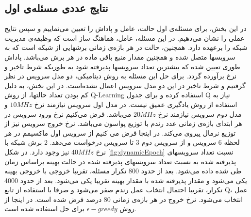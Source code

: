 \subsection{نتایج عددی مسئله‌ی اول}
در این بخش، برای مسئله‌ی اول حالت، عامل و پاداش را تعیین می‌نماییم و سپس نتایج عملی را نشان می‌دهیم.
در این مسئله، عامل، هماهنگ‌‌ ‌ساز  است که وظیفه‌ی مدیریت شبکه را برعهده دارد.
همچنین، حالت در هر بازه‌ی زمانی برشهایی از شبکه است که به سرویسها متصل شده و همچنین مقدار منبع باقی ماده در هر برش می‌باشد. 
پاداش طوری تعیین شده که بیشترین تعداد سرویسها پذیرفته شود به طوریکه شرط تاخیر و نرخ برآورده گردد.
برای حل این مسئله به روش دینامیکی، دو مدل سرویس در نظر گرفتیم و شرط تاخیر در این دو مدل سرویس اعمال نشده‌است.
در این بخش، به دلیل کم بودن تعداد حالتها، از روش Q-Learning استفاده کرده و برای جدول Q نیاز به استفاده از روش یادگیری عمیق نیست.
در مدل اول سرویس نیازمند نرخ $10MHz$ و مدل دوم سرویس نیازمند نرخ $20MHz$
می‌باشد. فرض می‌کنیم نرخ ورود سرویس در هر ابتدای بازه‌ی زمانی عدد رندم با توزیع پواسون می‌باشد. نرخ خروج سرویس نیز از توزیع نرمال پیروی می‌کند. در اینجا فرض می کنیم از  سرویس اول ماکسیمم در هر لحظه 6 سرویس و از سرویس دوم 3 تا سرویس درخواست می‌دهد. 2 برش شبکه با نرخ $40MHz$ نیز وجود دارد. 
در شکل \ref{fig:dynamicEpoch}
نسبت تعداد سرویسهای پذیرفته شده به نسبت تعداد سرویسهای پذیرفته شده در حالت بهینه براساس زمان طی شده داده می‌شود. بعد از حدود 800 تکرار مسئله، تقریبا خروجی با خروجی بهینه یکی می‌شود و مقدار پذیرفته شده با مقدار بهینه تقریبا یکی می‌شود. بعد از حدود 4000 تکرار، تقریبا احتمال انتخاب عمل رندم صفر می‌شود و صرفا با استفاده از تابع Q، عمل انتخاب می‌شود.
نرخ خروج در هر بازه‌ی زمانی $80$ درصد فرض شده است.
در اینجا از روش 
$\epsilon-greedy$
برای حل استفاده شده است.

